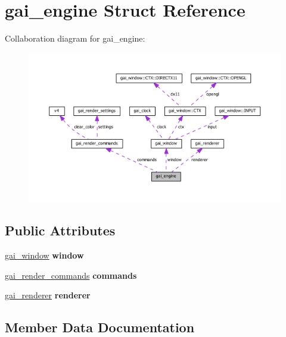 \hypertarget{structgai__engine}{}\section{gai\+\_\+engine Struct Reference}
\label{structgai__engine}


Collaboration diagram for gai\+\_\+engine\+:\nopagebreak
\begin{figure}[H]
\begin{center}
\leavevmode
\includegraphics[width=350pt]{structgai__engine__coll__graph}
\end{center}
\end{figure}
\subsection*{Public Attributes}
\begin{DoxyCompactItemize}
\item 
\mbox{\label{structgai__engine_a7460be72bda39ea674c38d1e45eed5ac}} 
\hyperlink{structgai__window}{gai\+\_\+window} {\bfseries window}
\item 
\mbox{\label{structgai__engine_a62a2f0b98a5fad5292229b9e1df42430}} 
\hyperlink{structgai__render__commands}{gai\+\_\+render\+\_\+commands} {\bfseries commands}
\item 
\mbox{\label{structgai__engine_adbeafcc6f92b0c4872671ceab7c78eb4}} 
\hyperlink{uniongai__renderer}{gai\+\_\+renderer} {\bfseries renderer}
\end{DoxyCompactItemize}


\subsection{Member Data Documentation}
\mbox{\label{structgai__engine_a62a2f0b98a5fad5292229b9e1df42430}} 
